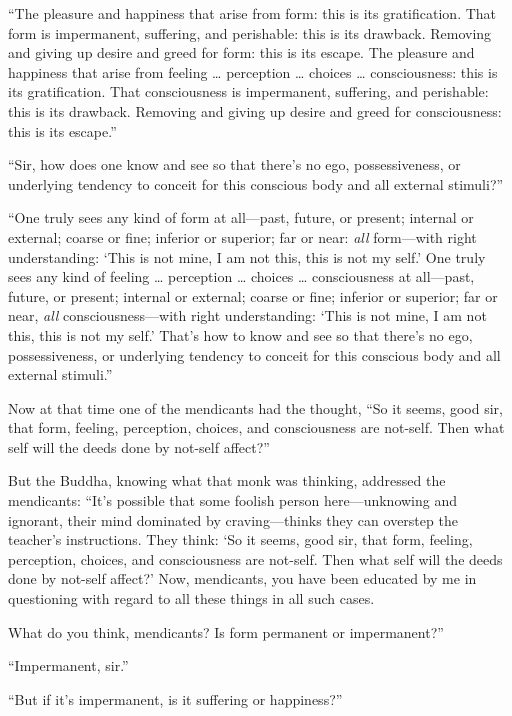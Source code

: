 \documentclass[12pt,openany]{book}%
\begin{document}
“The pleasure and happiness that arise from form: this is its gratification. That form is impermanent, suffering, and perishable: this is its drawback. Removing and giving up desire and greed for form: this is its escape. The pleasure and happiness that arise from feeling … perception … choices … consciousness: this is its gratification. That consciousness is impermanent, suffering, and perishable: this is its drawback. Removing and giving up desire and greed for consciousness: this is its escape.” 

“Sir, how does one know and see so that there’s no ego, possessiveness, or underlying tendency to conceit for this conscious body and all external stimuli?” 

“One truly sees any kind of form at all—past, future, or present; internal or external; coarse or fine; inferior or superior; far or near: \emph{all} form—with right understanding: ‘This is not mine, I am not this, this is not my self.’ One truly sees any kind of feeling … perception … choices … consciousness at all—past, future, or present; internal or external; coarse or fine; inferior or superior; far or near, \emph{all} consciousness—with right understanding: ‘This is not mine, I am not this, this is not my self.’ That’s how to know and see so that there’s no ego, possessiveness, or underlying tendency to conceit for this conscious body and all external stimuli.” 

Now at that time one of the mendicants had the thought, “So it seems, good sir, that form, feeling, perception, choices, and consciousness are not-self. Then what self will the deeds done by not-self affect?” 

But the Buddha, knowing what that monk was thinking, addressed the mendicants: “It’s possible that some foolish person here—unknowing and ignorant, their mind dominated by craving—thinks they can overstep the teacher’s instructions. They think: ‘So it seems, good sir, that form, feeling, perception, choices, and consciousness are not-self. Then what self will the deeds done by not-self affect?’ Now, mendicants, you have been educated by me in questioning with regard to all these things in all such cases. 

What do you think, mendicants? Is form permanent or impermanent?” 

“Impermanent, sir.” 

“But if it’s impermanent, is it suffering or happiness?” 
\end{document}
